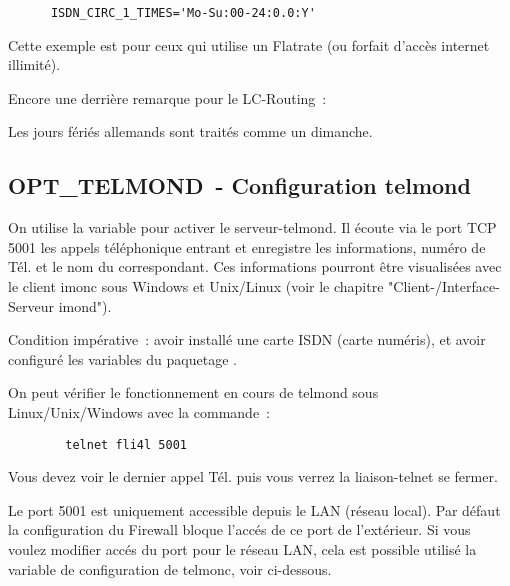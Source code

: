 \begin{description}
\begin{description}
\begin{example}
\begin{verbatim}
      ISDN_CIRC_1_TIMES='Mo-Su:00-24:0.0:Y'        
\end{verbatim}
\end{example}

      Cette exemple est pour ceux qui utilise un Flatrate (ou forfait d'accès
      internet illimité).

    \item Encore une derrière remarque pour le LC-Routing~:

      Les jours fériés allemands sont traités comme un dimanche.
    \end{description}

\end{description}

\subsection {OPT\_TELMOND~- Configuration telmond}

On utilise la variable  pour activer le serveur-telmond.
Il écoute via le port TCP 5001 les appels téléphonique entrant et enregistre
les informations, numéro de Tél. et le nom du correspondant. Ces informations
pourront être visualisées avec le client imonc sous Windows et Unix/Linux
(voir le chapitre "Client-/Interface-Serveur imond").

Condition impérative~: avoir installé une carte ISDN (carte numéris), et
avoir configuré les variables du paquetage .

On peut vérifier le fonctionnement en cours de telmond sous Linux/Unix/Windows
avec la commande~:

\begin{example}
\begin{verbatim}
        telnet fli4l 5001
\end{verbatim}
\end{example}

Vous devez voir le dernier appel Tél. puis vous verrez la liaison-telnet se fermer.

Le port 5001 est uniquement accessible depuis le LAN (réseau local). Par défaut
la configuration du Firewall bloque l'accés de ce port de l'extérieur. Si vous
voulez modifier accés du port pour le réseau LAN, cela est possible utilisé la
variable de configuration de telmonc, voir ci-dessous.

